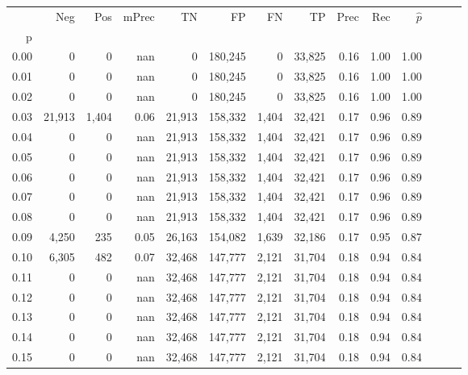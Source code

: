 \begin{tabular}{rrrrrrrrrrrrrr}
\toprule
{} &     Neg &    Pos & mPrec &       TN &       FP &      FN &      TP &  Prec &   Rec & $\hat{p}$ \\
p    &         &        &       &          &          &         &         &       &       &           \\
\midrule
0.00 &       0 &      0 &   nan &        0 &  180,245 &       0 &  33,825 &  0.16 &  1.00 &      1.00 \\
0.01 &       0 &      0 &   nan &        0 &  180,245 &       0 &  33,825 &  0.16 &  1.00 &      1.00 \\
0.02 &       0 &      0 &   nan &        0 &  180,245 &       0 &  33,825 &  0.16 &  1.00 &      1.00 \\
0.03 &  21,913 &  1,404 &  0.06 &   21,913 &  158,332 &   1,404 &  32,421 &  0.17 &  0.96 &      0.89 \\
0.04 &       0 &      0 &   nan &   21,913 &  158,332 &   1,404 &  32,421 &  0.17 &  0.96 &      0.89 \\
0.05 &       0 &      0 &   nan &   21,913 &  158,332 &   1,404 &  32,421 &  0.17 &  0.96 &      0.89 \\
0.06 &       0 &      0 &   nan &   21,913 &  158,332 &   1,404 &  32,421 &  0.17 &  0.96 &      0.89 \\
0.07 &       0 &      0 &   nan &   21,913 &  158,332 &   1,404 &  32,421 &  0.17 &  0.96 &      0.89 \\
0.08 &       0 &      0 &   nan &   21,913 &  158,332 &   1,404 &  32,421 &  0.17 &  0.96 &      0.89 \\
0.09 &   4,250 &    235 &  0.05 &   26,163 &  154,082 &   1,639 &  32,186 &  0.17 &  0.95 &      0.87 \\
0.10 &   6,305 &    482 &  0.07 &   32,468 &  147,777 &   2,121 &  31,704 &  0.18 &  0.94 &      0.84 \\
0.11 &       0 &      0 &   nan &   32,468 &  147,777 &   2,121 &  31,704 &  0.18 &  0.94 &      0.84 \\
0.12 &       0 &      0 &   nan &   32,468 &  147,777 &   2,121 &  31,704 &  0.18 &  0.94 &      0.84 \\
0.13 &       0 &      0 &   nan &   32,468 &  147,777 &   2,121 &  31,704 &  0.18 &  0.94 &      0.84 \\
0.14 &       0 &      0 &   nan &   32,468 &  147,777 &   2,121 &  31,704 &  0.18 &  0.94 &      0.84 \\
0.15 &       0 &      0 &   nan &   32,468 &  147,777 &   2,121 &  31,704 &  0.18 &  0.94 &      0.84 \\

\end{tabular}
